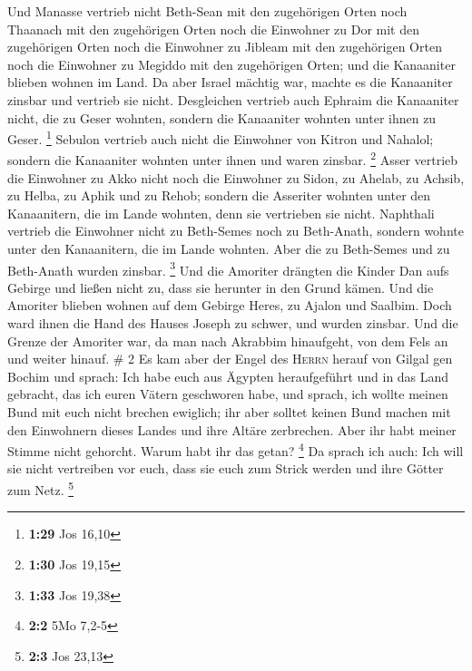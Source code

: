  Und Manasse vertrieb nicht Beth-Sean mit den zugehörigen
Orten noch Thaanach mit den zugehörigen Orten noch die Einwohner zu Dor
mit den zugehörigen Orten noch die Einwohner zu Jibleam mit den
zugehörigen Orten noch die Einwohner zu Megiddo mit den zugehörigen
Orten; und die Kanaaniter blieben wohnen im Land.  Da
aber Israel mächtig war, machte es die Kanaaniter zinsbar und vertrieb
sie nicht.  Desgleichen vertrieb auch Ephraim die
Kanaaniter nicht, die zu Geser wohnten, sondern die Kanaaniter wohnten
unter ihnen zu Geser. \footnote{\textbf{1:29} Jos 16,10} 
Sebulon vertrieb auch nicht die Einwohner von Kitron und Nahalol;
sondern die Kanaaniter wohnten unter ihnen und waren zinsbar.
\footnote{\textbf{1:30} Jos 19,15}  Asser vertrieb die
Einwohner zu Akko nicht noch die Einwohner zu Sidon, zu Ahelab, zu
Achsib, zu Helba, zu Aphik und zu Rehob;  sondern die
Asseriter wohnten unter den Kanaanitern, die im Lande wohnten, denn sie
vertrieben sie nicht.  Naphthali vertrieb die Einwohner
nicht zu Beth-Semes noch zu Beth-Anath, sondern wohnte unter den
Kanaanitern, die im Lande wohnten. Aber die zu Beth-Semes und zu
Beth-Anath wurden zinsbar. \footnote{\textbf{1:33} Jos 19,38}
 Und die Amoriter drängten die Kinder Dan aufs Gebirge
und ließen nicht zu, dass sie herunter in den Grund kämen.
 Und die Amoriter blieben wohnen auf dem Gebirge Heres,
zu Ajalon und Saalbim. Doch ward ihnen die Hand des Hauses Joseph zu
schwer, und wurden zinsbar.  Und die Grenze der Amoriter
war, da man nach Akrabbim hinaufgeht, von dem Fels an und weiter hinauf.
\# 2  Es kam aber der Engel des \textsc{Herrn} herauf von
Gilgal gen Bochim und sprach: Ich habe euch aus Ägypten heraufgeführt
und in das Land gebracht, das ich euren Vätern geschworen habe, und
sprach, ich wollte meinen Bund mit euch nicht brechen ewiglich;
 ihr aber solltet keinen Bund machen mit den Einwohnern
dieses Landes und ihre Altäre zerbrechen. Aber ihr habt meiner Stimme
nicht gehorcht. Warum habt ihr das getan? \footnote{\textbf{2:2} 5Mo
  7,2-5}  Da sprach ich auch: Ich will sie nicht
vertreiben vor euch, dass sie euch zum Strick werden und ihre Götter zum
Netz. \footnote{\textbf{2:3} Jos 23,13}

